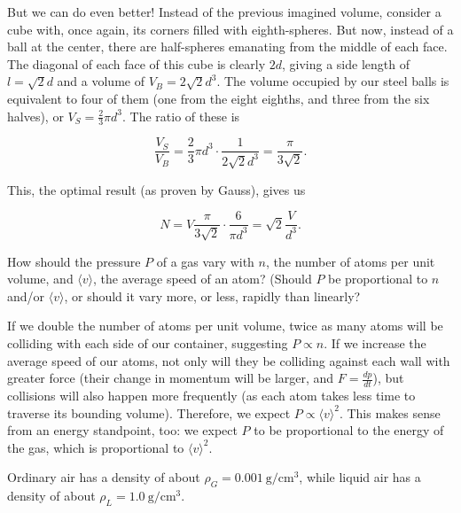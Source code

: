 \documentclass[../feynman-lectures-on-physics.tex]{subfiles}
\begin{document}
\begin{questions}
\begin{solution}
	But we can do even better! Instead of the previous imagined volume, consider a cube with, once again, its corners filled with eighth-spheres. But now, instead of a ball at the center, there are half-spheres emanating from the middle of each face. The diagonal of each face of this cube is clearly $2d$, giving a side length of $l = \sqrt{2}d$ and a volume of $V_B = 2\sqrt{2}d^3$. The volume occupied by our steel balls is equivalent to four of them (one from the eight eighths, and three from the six halves), or $V_S = \frac{2}{3}\pi{d^3}$. The ratio of these is

	\[
	\frac{V_S}{V_B} = \frac{2}{3}\pi{d^3}\cdot\frac{1}{2\sqrt{2}d^3} = \frac{\pi}{3\sqrt{2}}
	.\] 

	This, the optimal result (as proven by Gauss), gives us

	\[
	N = V\frac{\pi}{3\sqrt{2}}\cdot\frac{6}{\pi{d^3}} = \sqrt{2}\frac{V}{d^3}
	.\] 
\end{solution}

\question How should the pressure $P$ of a gas vary with $n$, the number of atoms per unit volume, and $\langle{v}\rangle$, the average speed of an atom? (Should $P$ be proportional to $n$ and/or $\langle{v}\rangle$, or should it vary more, or less, rapidly than linearly?

\begin{solution}
	If we double the number of atoms per unit volume, twice as many atoms will be colliding with each side of our container, suggesting $P \propto n$. If we increase the average speed of our atoms, not only will they be colliding against each wall with greater force (their change in momentum will be larger, and $F = \frac{dp}{dt}$), but collisions will also happen more frequently (as each atom takes less time to traverse its bounding volume). Therefore, we expect $P \propto \langle{v}\rangle^2$. This makes sense from an energy standpoint, too: we expect $P$ to be proportional to the energy of the gas, which is proportional to $\langle{v}\rangle^2$.
\end{solution}

\question Ordinary air has a density of about $\rho_G = \SI{0.001}{\gram\per\centi\meter\cubed}$, while liquid air has a density of about $\rho_L = \SI{1.0}{\gram\per\centi\meter\cubed}$.
\end{questions}
\end{document}
